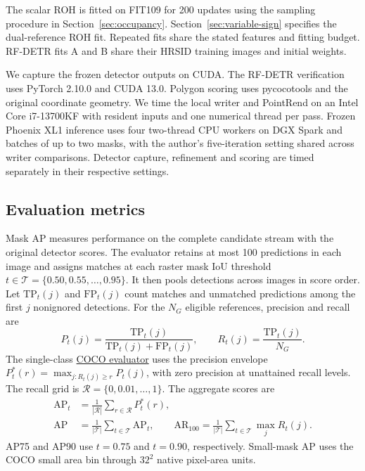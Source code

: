 \documentclass[journal]{IEEEtran}
\begin{document}
The scalar ROH is fitted on FIT109 for 200 updates using the sampling procedure in Section~\ref{sec:occupancy}. Section~\ref{sec:variable-sign} specifies the dual-reference ROH fit. Repeated fits share the stated features and fitting budget. RF-DETR fits A and B share their HRSID training images and initial weights.

We capture the frozen detector outputs on CUDA. The RF-DETR verification uses PyTorch 2.10.0 and CUDA 13.0. Polygon scoring uses pycocotools and the original coordinate geometry. We time the local writer and PointRend on an Intel Core i7-13700KF with resident inputs and one numerical thread per pass. Frozen Phoenix XL1 inference uses four two-thread CPU workers on DGX Spark and batches of up to two masks, with the author's five-iteration setting shared across writer comparisons. Detector capture, refinement and scoring are timed separately in their respective settings.

\subsection{Evaluation metrics}
\label{sec:metrics}

Mask AP measures performance on the complete candidate stream with the original detector scores. The evaluator retains at most 100 predictions in each image and assigns matches at each raster mask IoU threshold \(t\in\mathcal T=\{0.50,0.55,\ldots,0.95\}\). It then pools detections across images in score order. Let \(\mathrm{TP}_t(j)\) and \(\mathrm{FP}_t(j)\) count matches and unmatched predictions among the first \(j\) nonignored detections. For the \(N_G\) eligible references, precision and recall are
\begin{equation}
 P_t(j)=\frac{\mathrm{TP}_t(j)}{\mathrm{TP}_t(j)+\mathrm{FP}_t(j)},
 \qquad R_t(j)=\frac{\mathrm{TP}_t(j)}{N_G}.
\end{equation}
The single-class \href{https://github.com/cocodataset/cocoapi/blob/master/PythonAPI/pycocotools/cocoeval.py}{COCO evaluator} uses the precision envelope \(P_t^*(r)=\max_{j:R_t(j)\ge r}P_t(j)\), with zero precision at unattained recall levels. The recall grid is \(\mathcal R=\{0,0.01,\ldots,1\}\). The aggregate scores are
\begin{equation}
\begin{aligned}
 \mathrm{AP}_t&=\frac{1}{|\mathcal R|}\sum_{r\in\mathcal R}P_t^*(r),\\
 \mathrm{AP}&=\frac{1}{|\mathcal T|}\sum_{t\in\mathcal T}\mathrm{AP}_t,\qquad
 \mathrm{AR}_{100}=\frac{1}{|\mathcal T|}\sum_{t\in\mathcal T}\max_j R_t(j).
\end{aligned}
\label{eq:coco-metrics}
\end{equation}
AP75 and AP90 use \(t=0.75\) and \(t=0.90\), respectively. Small-mask AP uses the COCO small area bin through \(32^2\) native pixel-area units.
\end{document}
